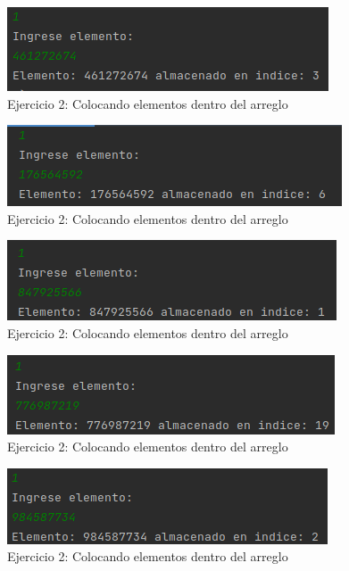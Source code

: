 \documentclass{article}
\begin{document}
			\begin{figure}[H]
				\centering
				\includegraphics{images/e25.png}
				\caption*{Ejercicio 2: Colocando elementos dentro del arreglo}
			\end{figure}
			
			\begin{figure}[H]
				\centering
				\includegraphics{images/e26.png}
				\caption*{Ejercicio 2: Colocando elementos dentro del arreglo}
			\end{figure}
			
			\begin{figure}[H]
				\centering
				\includegraphics{images/e27.png}
			\caption*{Ejercicio 2: Colocando elementos dentro del arreglo}
			\end{figure}
			
			\begin{figure}[H]
				\centering
				\includegraphics{images/e28.png}
				\caption*{Ejercicio 2: Colocando elementos dentro del arreglo}
			\end{figure}
			
			\begin{figure}[H]
				\centering
				\includegraphics{images/e29.png}
			\caption*{Ejercicio 2: Colocando elementos dentro del arreglo}
			\end{figure}
			
\end{document}
